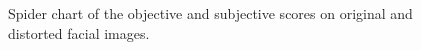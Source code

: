 \begin{figure}[h]
    \caption{Spider chart of the objective and subjective scores on original and distorted facial images.}
    \label{fig:spiderDist2}
\end{figure}

